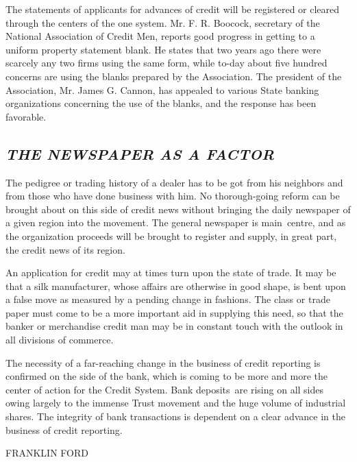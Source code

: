 \documentclass[twoside,symmetric,nobib,justified]{tufte-book}
\begin{document}
The statements of applicants for advances of credit will be registered
or cleared through the centers of the one system. Mr. F. R. Boocock,
secretary of the National Association of Credit Men, reports good
progress in getting to a uniform property statement blank. He states
that two years ago there were scarcely any two firms using the same
form, while to-day about five hundred concerns are using the blanks
prepared by the Association. The president of the Association, Mr. James
G. Cannon, has appealed to various State banking organizations
concerning the use of the blanks, and the response has been favorable.~

\hypertarget{the-newspaper-as-a-factor}{%
\subsection{\texorpdfstring{\emph{THE NEWSPAPER AS A
FACTOR}}{THE NEWSPAPER AS A FACTOR}}\label{the-newspaper-as-a-factor}}

The pedigree or trading history of a dealer has to be got from his
neighbors and from those who have done business with him. No
thorough-going reform can be brought about on this side of credit news
without bringing the daily newspaper of a given region into the
movement. The general newspaper is main~centre, and as the organization
proceeds will be brought to register and supply, in great part, the
credit news of its region.~

\enlargethispage{\baselineskip}

An application for credit may at times turn upon the state of trade. It
may be that a silk manufacturer, whose affairs are otherwise in good
shape, is bent upon a false move as measured by a pending change in
fashions. The class or trade paper must come to be a more important aid
in supplying this need, so that the banker or merchandise credit man may
be in constant touch with the outlook in all divisions of commerce.~

The necessity of a far-reaching change in the business of credit
reporting is confirmed on the side of the bank, which is coming to be
more and more the center of action for the Credit System. Bank
deposits~are rising on all sides owing largely to the immense Trust
movement and the huge volume of industrial shares. The integrity of bank
transactions is dependent on a clear advance in the business of credit
reporting.

\vspace{0.2in}

\hfill{\Large FRANKLIN FORD}
\end{document}
